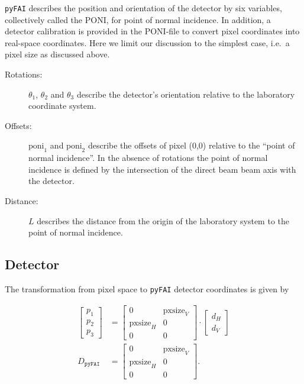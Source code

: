 \documentclass[12pt]{article}
\begin{document}
\texttt{pyFAI} describes the position and orientation of the detector
by six variables, collectively called the PONI, for point of normal
incidence. In addition, a detector calibration is provided in the
PONI-file to convert pixel coordinates into real-space
coordinates. Here we limit our discussion to the simplest case, i.e.~a
pixel size as discussed above.

\begin{description}
\item[Rotations:] $\theta_1$, $\theta_2$ and $\theta_3$ describe the
  detector's orientation relative to the laboratory coordinate system.

\item[Offsets:] $\mathrm{poni}_1$ and $\mathrm{poni}_2$ describe the
  offsets of pixel (0,0) relative to the ``point of normal
  incidence''. In the absence of rotations the point of normal
  incidence is defined by the intersection of the direct beam beam
  axis with the detector.

\item[Distance:] $L$ describes the distance from the origin of the
  laboratory system to the point of normal incidence.
\end{description}

\subsection{Detector}

The transformation from pixel space to \texttt{pyFAI} detector
coordinates is given by

\begin{align}
  \begin{bmatrix} p_1 \\ p_2 \\ p_3 \end{bmatrix}
  & =
  \begin{bmatrix}
    0 & \mathrm{pxsize}_V \\
    \mathrm{pxsize}_H & 0 \\
    0 & 0
  \end{bmatrix}
  \cdot
  \begin{bmatrix} d_H \\ d_V \end{bmatrix}
  \\
  D_{\mathtt{pyFAI}}
  & =
  \begin{bmatrix}
    0 & \mathrm{pxsize}_V \\
    \mathrm{pxsize}_H & 0 \\
    0 & 0
  \end{bmatrix}.
  \label{eq-dmatrixpyFAI}
\end{align}
\end{document}
